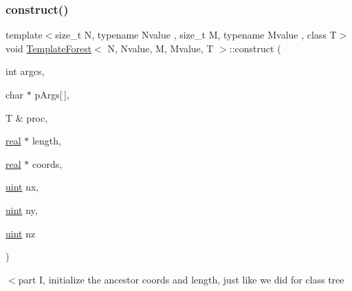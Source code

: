 \mbox{\label{classTemplateForest_a6173898510ccf3f57a6b930a31f971dd}} 
\subsubsection{\texorpdfstring{construct()}{construct()}}
{\footnotesize\ttfamily template$<$size\+\_\+t N, typename Nvalue , size\+\_\+t M, typename Mvalue , class T$>$ \\
void \mbox{\hyperlink{classTemplateForest}{Template\+Forest}}$<$ N, Nvalue, M, Mvalue, T $>$\+::construct (\begin{DoxyParamCaption}\item[{int}]{argcs,  }\item[{char $\ast$}]{p\+Args\mbox{[}$\,$\mbox{]},  }\item[{T \&}]{proc,  }\item[{\mbox{\hyperlink{definitions_8h_aedc0ad84d1e764530814f57ad931d02a}{real}} $\ast$}]{length,  }\item[{\mbox{\hyperlink{definitions_8h_aedc0ad84d1e764530814f57ad931d02a}{real}} $\ast$}]{coords,  }\item[{\mbox{\hyperlink{definitions_8h_a69aa29b598b851b0640aa225a9e5d61d}{uint}}}]{nx,  }\item[{\mbox{\hyperlink{definitions_8h_a69aa29b598b851b0640aa225a9e5d61d}{uint}}}]{ny,  }\item[{\mbox{\hyperlink{definitions_8h_a69aa29b598b851b0640aa225a9e5d61d}{uint}}}]{nz }\end{DoxyParamCaption})}

$<$part I, initialize the ancestor coords and length, just like we did for class tree \mbox{\label{classTemplateForest_ab6f0a6f80253a0253ed7882dfdf052ad}} 
